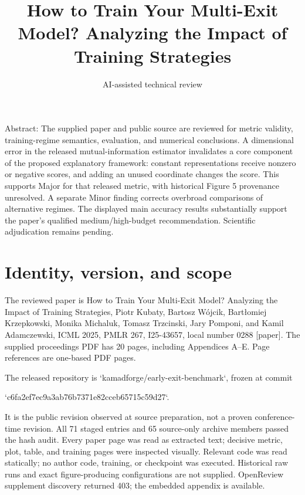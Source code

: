 \documentclass[10pt]{article}
\title{How to Train Your Multi-Exit Model? Analyzing the Impact of Training Strategies}
\author{AI-assisted technical review}
\date{}
\begin{document}
\maketitle
Abstract: The supplied paper and public source are reviewed for metric validity, training-regime semantics, evaluation, and numerical conclusions. A dimensional error in the released mutual-information estimator invalidates a core component of the proposed explanatory framework: constant representations receive nonzero or negative scores, and adding an unused coordinate changes the score. This supports Major for that released metric, with historical Figure 5 provenance unresolved. A separate Minor finding corrects overbroad comparisons of alternative regimes. The displayed main accuracy results substantially support the paper’s qualified medium/high-budget recommendation. Scientific adjudication remains pending.\par
\section*{Identity, version, and scope}
The reviewed paper is How to Train Your Multi-Exit Model? Analyzing the Impact of Training Strategies, Piotr Kubaty, Bartosz Wójcik, Bartłomiej Krzepkowski, Monika Michaluk, Tomasz Trzcinski, Jary Pomponi, and Kamil Adamczewski, ICML 2025, PMLR 267, I25-43657, local number 0288 [paper]. The supplied proceedings PDF has 20 pages, including Appendices A–E. Page references are one-based PDF pages.\par
The released repository is `kamadforge/early-exit-benchmark`, frozen at commit\par
`c6fa2ef7ec9a3ab76b7371e82cceb65715c59d27`.\par
It is the public revision observed at source preparation, not a proven conference-time revision. All 71 staged entries and 65 source-only archive members passed the hash audit. Every paper page was read as extracted text; decisive metric, plot, table, and training pages were inspected visually. Relevant code was read statically; no author code, training, or checkpoint was executed. Historical raw runs and exact figure-producing configurations are not supplied. OpenReview supplement discovery returned 403; the embedded appendix is available.\par
\end{document}
